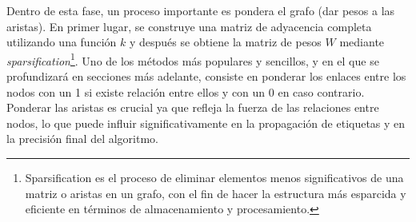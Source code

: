 Dentro de esta fase, un proceso importante es pondera el grafo (dar pesos a las aristas). En primer lugar, se construye una matriz de adyacencia completa utilizando una función $k$ y después se obtiene la matriz de pesos $W$ mediante \textit{sparsification}\footnote{Sparsification es el proceso de eliminar elementos menos significativos de una matriz o aristas en un grafo, con el fin de hacer la estructura más esparcida y eficiente en términos de almacenamiento y procesamiento.}. Uno de los métodos más populares y sencillos, y en el que se profundizará en secciones más adelante, consiste en ponderar los enlaces entre los nodos con un 1 si existe relación entre ellos y con un 0 en caso contrario. Ponderar las aristas es crucial ya que refleja la fuerza de las relaciones entre nodos, lo que puede influir significativamente en la propagación de etiquetas y en la precisión final del algoritmo.


